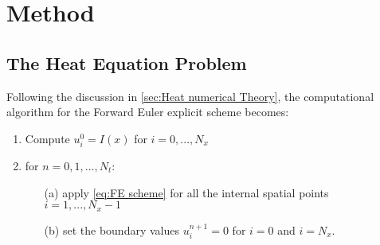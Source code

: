 \section{Method}\label{sec:Method}

\subsection{The Heat Equation Problem}\label{sec:heat method}

Following the discussion in \autoref{sec:Heat numerical Theory}, the computational algorithm \cite{hpl} for the Forward Euler explicit scheme becomes:
\begin{enumerate}
    \item Compute $u_i^0 = I(x)$ for $i=0, ..., N_x$
    \item for $n=0,1, ..., N_t$:
        \begin{itemize}
            \item[(a)] apply \autoref{eq:FE scheme} for all the internal spatial points $i=1, ..., N_x - 1$
            \item[(b)] set the boundary values $u_i^{n+1}=0$ for $i=0$ and $i=N_x$.
        \end{itemize}
\end{enumerate}


